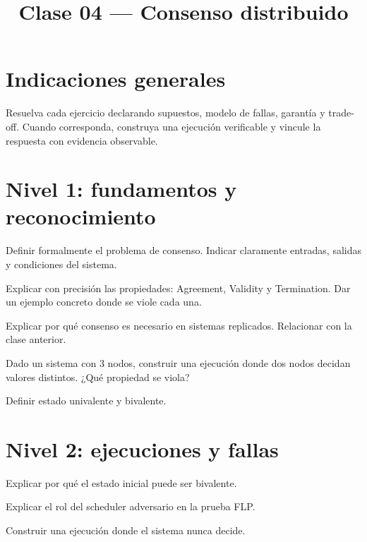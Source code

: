 \documentclass[variant=guia,cover=institutional,mode=screen]{ua-engineering-v6-article}
\title{Clase 04 --- Consenso distribuido}
\author{\UAProfessor}
\date{\UADate}
\begin{document}
\section{Indicaciones generales}
Resuelva cada ejercicio declarando supuestos, modelo de fallas, garantía y trade-off. Cuando corresponda, construya una ejecución verificable y vincule la respuesta con evidencia observable.

\section{Nivel 1: fundamentos y reconocimiento}
\begin{uaexercise}
Definir formalmente el problema de consenso. Indicar claramente entradas, salidas y condiciones del sistema.
\end{uaexercise}

\begin{uaexercise}
Explicar con precisión las propiedades:
Agreement, Validity y Termination.  
Dar un ejemplo concreto donde se viole cada una.
\end{uaexercise}

\begin{uaexercise}
Explicar por qué consenso es necesario en sistemas replicados.
Relacionar con la clase anterior.
\end{uaexercise}

\begin{uaexercise}
Dado un sistema con 3 nodos, construir una ejecución donde dos nodos decidan valores distintos.
¿Qué propiedad se viola?
\end{uaexercise}

\begin{uaexercise}
Definir estado univalente y bivalente.
\end{uaexercise}


\section{Nivel 2: ejecuciones y fallas}
\begin{uaexercise}
Explicar por qué el estado inicial puede ser bivalente.
\end{uaexercise}

\begin{uaexercise}
Explicar el rol del scheduler adversario en la prueba FLP.
\end{uaexercise}

\begin{uaexercise}
Construir una ejecución donde el sistema nunca decide.
\end{uaexercise}
\end{document}

